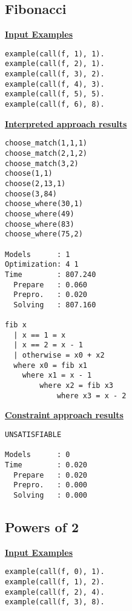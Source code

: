 \subsection{Fibonacci}
\underline{\textbf{Input Examples}}
\begin{lstlisting}
example(call(f, 1), 1).
example(call(f, 2), 1).
example(call(f, 3), 2).
example(call(f, 4), 3).
example(call(f, 5), 5).
example(call(f, 6), 8).
\end{lstlisting}

\begin{multicols*}{2}
\underline{\textbf{Interpreted approach results}}
\begin{lstlisting}
choose_match(1,1,1) 
choose_match(2,1,2) 
choose_match(3,2) 
choose(1,1) 
choose(2,13,1) 
choose(3,84) 
choose_where(30,1) 
choose_where(49) 
choose_where(83) 
choose_where(75,2) 

Models      : 1     
Optimization: 4 1 
Time        : 807.240
  Prepare   : 0.060
  Prepro.   : 0.020
  Solving   : 807.160

fib x
  | x == 1 = x
  | x == 2 = x - 1
  | otherwise = x0 + x2
  where x0 = fib x1
  	where x1 = x - 1
  		where x2 = fib x3
  			where x3 = x - 2
\end{lstlisting}
\vspace*{\fill}
\columnbreak
\underline{\textbf{Constraint approach results}}
\begin{lstlisting}
UNSATISFIABLE

Models      : 0     
Time        : 0.020
  Prepare   : 0.020
  Prepro.   : 0.000
  Solving   : 0.000
\end{lstlisting}
\end{multicols*}

\pagebreak
\subsection{Powers of 2}
\underline{\textbf{Input Examples}}
\begin{lstlisting}
example(call(f, 0), 1).
example(call(f, 1), 2).
example(call(f, 2), 4).
example(call(f, 3), 8).
\end{lstlisting}

